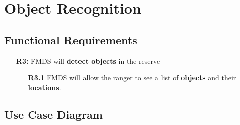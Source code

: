 \section{ Object Recognition }
\subsection{Functional Requirements}
	\begin{flushleft}
		\begin{itemize}
			\item  [\textbf{R3:}] FMDS will \textbf{detect objects} in the reserve

				\begin{itemize}
					\item  [\textbf{R3.1}] FMDS will allow the ranger to see a list of \textbf{objects} and their \textbf{locations}.
				\end{itemize}
		\end{itemize}
	\end{flushleft}

\subsection{Use Case Diagram}


